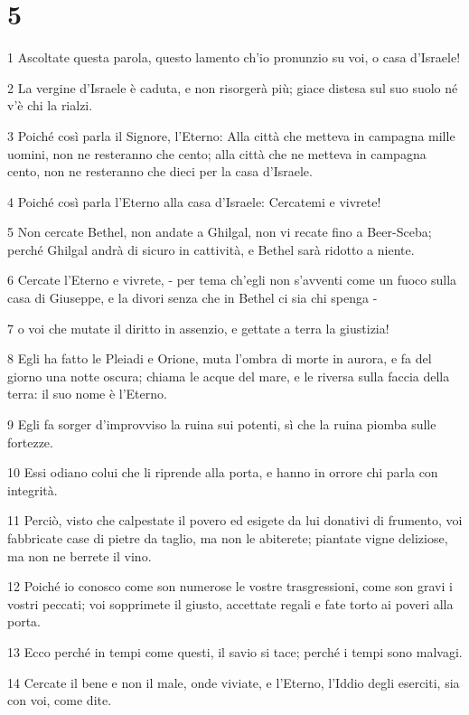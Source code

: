 \chapter{5}

\par 1 Ascoltate questa parola, questo lamento ch'io pronunzio su voi, o casa d'Israele!
\par 2 La vergine d'Israele è caduta, e non risorgerà più; giace distesa sul suo suolo né v'è chi la rialzi.
\par 3 Poiché così parla il Signore, l'Eterno: Alla città che metteva in campagna mille uomini, non ne resteranno che cento; alla città che ne metteva in campagna cento, non ne resteranno che dieci per la casa d'Israele.
\par 4 Poiché così parla l'Eterno alla casa d'Israele: Cercatemi e vivrete!
\par 5 Non cercate Bethel, non andate a Ghilgal, non vi recate fino a Beer-Sceba; perché Ghilgal andrà di sicuro in cattività, e Bethel sarà ridotto a niente.
\par 6 Cercate l'Eterno e vivrete, - per tema ch'egli non s'avventi come un fuoco sulla casa di Giuseppe, e la divori senza che in Bethel ci sia chi spenga -
\par 7 o voi che mutate il diritto in assenzio, e gettate a terra la giustizia!
\par 8 Egli ha fatto le Pleiadi e Orione, muta l'ombra di morte in aurora, e fa del giorno una notte oscura; chiama le acque del mare, e le riversa sulla faccia della terra: il suo nome è l'Eterno.
\par 9 Egli fa sorger d'improvviso la ruina sui potenti, sì che la ruina piomba sulle fortezze.
\par 10 Essi odiano colui che li riprende alla porta, e hanno in orrore chi parla con integrità.
\par 11 Perciò, visto che calpestate il povero ed esigete da lui donativi di frumento, voi fabbricate case di pietre da taglio, ma non le abiterete; piantate vigne deliziose, ma non ne berrete il vino.
\par 12 Poiché io conosco come son numerose le vostre trasgressioni, come son gravi i vostri peccati; voi sopprimete il giusto, accettate regali e fate torto ai poveri alla porta.
\par 13 Ecco perché in tempi come questi, il savio si tace; perché i tempi sono malvagi.
\par 14 Cercate il bene e non il male, onde viviate, e l'Eterno, l'Iddio degli eserciti, sia con voi, come dite.

